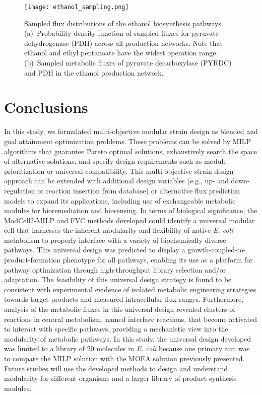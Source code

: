 \begin{figure}[!ht]
    \centering
    \texttt{[image: ethanol\_sampling.png]}
    \caption[Sampled flux distributions of the ethanol biosynthesis pathways]{Sampled flux distributions of the ethanol biosynthesis pathways. (a)~Probability density function of sampled fluxes for pyruvate dehydrogenase (PDH) across all production networks. Note that ethanol and ethyl pentanoate have the widest operation range. (b)~Sampled metabolic fluxes of pyruvate decarboxylase (PYRDC) and PDH in the ethanol production network.}
    \label{fig5:sampling}
\end{figure}%


\section{Conclusions}
In this study, we formulated multi-objective modular strain design as blended and goal attainment optimization problems. These problems can be solved by MILP algorithms that guarantee Pareto optimal solutions, exhaustively search the space of alternative solutions, and specify design requirements such as module prioritization or universal compatibility.
This multi-objective strain design approach can be extended with additional design variables (e.g., up- and down-regulation\citep{pharkya2004} or reaction insertion from database\citep{pharkya2006}) or alternative flux prediction models\citep{chowdhury2014,dinh2018} to expand its applications, including use of exchangeable metabolic modules for bioremediation  and biosensing.
In terms of biological significance, the ModCell2-MILP and FVC methods developed could identify a universal modular cell that harnesses the inherent modularity and flexibility of native \textit{E. coli} metabolism to properly interface with a variety of biochemically diverse pathways. This universal design was predicted to display a growth-coupled-to- product-formation phenotype for all pathways, enabling its use as a platform for pathway optimization through high-throughput library selection and/or adaptation. The feasibility of this universal design strategy is found to be consistent with experimental evidence of isolated metabolic engineering strategies towards target products and measured intracellular flux ranges. Furthermore, analysis of the metabolic fluxes in this universal design revealed clusters of reactions in central metabolism, named interface reactions, that become activated to interact with specific pathways, providing a mechanistic view into the modularity of metabolic pathways.
In this study, the universal design developed was limited to a library of 20 molecules in \textit{E. coli} because one primary aim was to compare the MILP solution with the MOEA solution previously presented. Future studies will use the developed methods to design and understand modularity for different organisms and a larger library of product synthesis modules.



